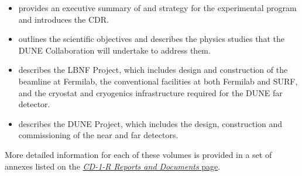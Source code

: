 \begin{itemize}
\item \volintro{} provides an executive summary of and strategy for the experimental 
program and introduces the CDR.
\item \volphys{} outlines the scientific objectives and describes the physics studies that 
the DUNE Collaboration will undertake to address them.
\item \vollbnf{} describes the LBNF Project, which includes design and construction of the 
beamline at Fermilab, the conventional facilities at both Fermilab and SURF, and the cryostat
 and cryogenics infrastructure required for the DUNE far detector.
\item \voldune{} describes the DUNE Project, which includes the design, construction and 
commissioning of the near and far detectors. 
\end{itemize}

More detailed information for each of these volumes is provided in a set of annexes listed on the \href{https://web.fnal.gov/project/LBNF/SitePages/CD-1-R%20Reports%20and%20Documents.aspx}{\textit{CD-1-R Reports and Documents} page}. 


